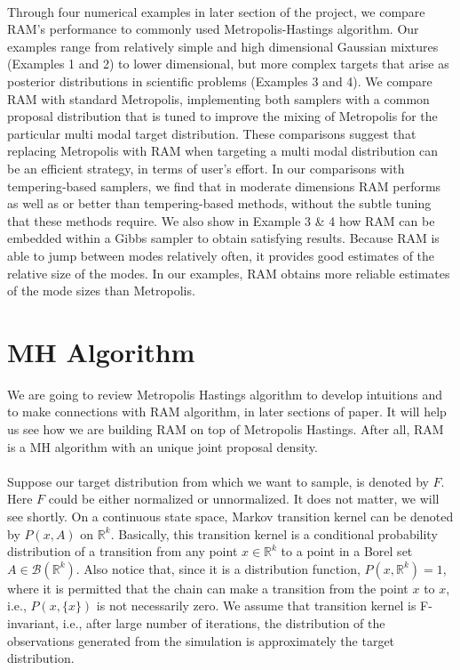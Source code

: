\documentclass{article}
\begin{document}
\paragraph{}Through four numerical examples in later section of the project, we compare  RAM’s
performance to  commonly used Metropolis-Hastings algorithm. Our examples range from relatively
simple and high dimensional Gaussian mixtures (Examples 1
and 2) to lower dimensional, but more complex targets that arise
as posterior distributions in scientific problems (Examples 3 and
4). We compare RAM with standard Metropolis, implementing
both samplers with a common proposal distribution that is tuned to
improve the mixing of Metropolis for the particular multi modal
target distribution. These comparisons suggest that replacing
Metropolis with RAM when targeting a multi modal distribution
can be an efficient strategy, in terms of user’s effort. In our comparisons with tempering-based samplers, we find
that in moderate dimensions RAM performs as well as or better
than tempering-based methods, without the subtle tuning that
these methods require. We also show in Example 3 \& 4 how RAM can be embedded
within a Gibbs sampler to obtain satisfying results.  Because
RAM is able to jump between modes relatively often, it provides
good estimates of the relative size of the modes. In our examples, RAM obtains more reliable estimates of the mode sizes than
Metropolis. 
 
\section{MH Algorithm}
We are going to review Metropolis Hastings algorithm to develop intuitions and to make connections with RAM algorithm, in later sections of paper. It will help us see how we are building RAM on top of Metropolis Hastings. After all, RAM is a MH algorithm with an unique joint proposal density.
\paragraph{}Suppose our target distribution from which we want to sample, is denoted by $F$. Here $F$ could be either normalized or unnormalized. It does not matter, we will see shortly. %
On a continuous state space, Markov transition kernel can be denoted by $P(x,A)$ on $\mathbb{R}^k$. Basically, this transition kernel is a conditional probability distribution of a transition from any point $x \in \mathbb{R}^k$ to a point in a Borel set $A \in \mathcal{B}(\mathbb{R}^{k})$. Also notice that, since it is a distribution function,
$P(x,\mathbb{R}^{k}) = 1$, where it is permitted that the chain can make a transition from the point $x$ to $x$, i.e., $P(x, \{x\})$ is not necessarily zero. We assume that transition kernel is F-invariant, i.e., after large number of iterations, the distribution of the observations generated from the simulation is approximately the target distribution.%
\end{document}
